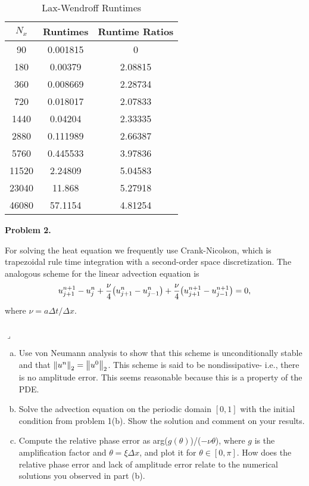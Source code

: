 \documentclass[12pt]{article}
\newenvironment{myprob}[1]
    {%
    \noindent{\Huge$\ulcorner$}\textbf{#1.}\begin{em}
    }
    { 
    \end{em} \\ \hphantom{l} \hfill {\Huge$\lrcorner$} }
\begin{document}
\begin{minipage}{0.5\textwidth}
\begin{table}[H]
\caption{Lax-Wendroff Runtimes}
\centering\begin{tabular}{||c|cc||}
\hline \hline
    $N_x$ &   Runtimes &   Runtime Ratios \\
\hline
    90 &   0.001815 &          0       \\
   180 &   0.00379  &          2.08815 \\
   360 &   0.008669 &          2.28734 \\
   720 &   0.018017 &          2.07833 \\
  1440 &   0.04204  &          2.33335 \\
  2880 &   0.111989 &          2.66387 \\
  5760 &   0.445533 &          3.97836 \\
 11520 &   2.24809  &          5.04583 \\
 23040 &  11.868    &          5.27918 \\
 46080 &  57.1154   &          4.81254 \\
\hline \hline
\end{tabular}\end{table}\end{minipage}


\begin{myprob}{Problem 2}
For solving the heat equation we frequently use Crank-Nicolson, which is trapezoidal rule time integration with a second-order space discretization.  The analogous scheme for the linear advection equation is
$$u_{j+1}^{n+1} - u_{j}^{n} + \dfrac{\nu}{4}\qty(u_{j+1}^{n}-u_{j-1}^{n}) + \dfrac{\nu}{4}\qty(u_{j+1}^{n+1}-u_{j-1}^{n+1}) =0,$$
where $\nu = a\Delta t/\Delta x$.
\end{myprob}
\begin{enumerate}[(a)]
\item Use von Neumann analysis to show that this scheme is unconditionally stable and that $\norm{u^n}_2 = \norm{u^0}_2$.  This scheme is said to be nondissipative- i.e., there is no amplitude error.  This seems reasonable because this is a property of the PDE.

\item Solve the advection equation on the periodic domain $[0,1]$ with the initial condition from problem 1(b).  Show the solution and comment on your results.

\item Compute the relative phase error as arg($g(\theta)$)/($-\nu\theta$), where $g$ is the amplification factor and $\theta = \xi\Delta x$, and plot it for $\theta\in[0,\pi]$.  How does the relative phase error and lack of amplitude error relate to the numerical solutions you observed in part (b).
\end{enumerate}
\end{document}
